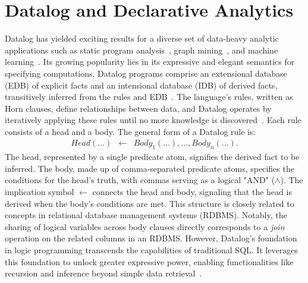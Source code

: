 \documentclass[nonacm,sigplan]{acmart}
\newcommand{\tool}{\textsc{GPUlog}}
\begin{document}

\section{Datalog and Declarative Analytics}
\label{sec:datalog}


Datalog has yielded exciting results for a diverse set of data-heavy analytic applications such as static program analysis~\cite{bravenboer2009strictly}, graph mining~\cite{seo2013socialite}, and machine learning~\cite{
mooney1996inductive}. Its growing popularity lies in its expressive and elegant semantics for specifying computations. Datalog programs comprise an extensional database (EDB) of explicit facts and an intensional database (IDB) of derived facts, transitively inferred from the rules and EDB~\cite{green2013datalog}. The language's rules, written as Horn clauses, define relationships between data, and Datalog operates by iteratively applying these rules until no more knowledge is discovered~\cite{maier2018datalog}. Each rule consists of a head and a body. The general form of a Datalog rule is:
\[
\begin{array}{lcl}
 \textit{Head}(...)  & \leftarrow & \textit{Body}_1(...), ..., \textit{Body}_n(...).
\end{array}
\]
The head, represented by a single predicate atom, signifies the derived fact to be inferred. The body, made up of comma-separated predicate atoms, specifies the conditions for the head's truth, with commas serving as a logical "AND" ($\land$). 
The implication symbol $\leftarrow$ connects the head and body, signaling that the head is derived when the body's conditions are met. This structure is closely related to concepts in relational database management systems (RDBMS). Notably, the sharing of logical variables across body clauses directly corresponds to a \emph{join} operation on the related columns in an RDBMS. However, Datalog's foundation in logic programming transcends the capabilities of traditional SQL. It leverages this foundation to unlock greater expressive power, enabling functionalities like recursion and inference beyond simple data retrieval~\cite{10.1145/2892208.2892226}.
\end{document}
